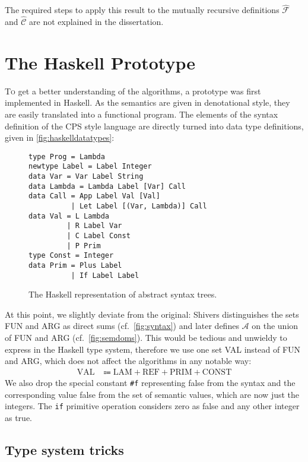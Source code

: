 \documentclass[a4paper,halfparskip,DIV=10,11pt]{scrbook}
\newcommand{\A}{\mathcal A}
\newcommand{\aC}{\widehat{\mathcal C}}
\newcommand{\aF}{\widehat{\mathcal F}}
\begin{document}
The required steps to apply this result to the mutually recursive definitions $\aF$ and $\aC$ are not explained in the dissertation.

\chapter{The Haskell Prototype}
\label{chaphaskell}

\lettrine T{o} get a better understanding of the algorithms, a prototype was first implemented in Haskell. As the semantics are given in denotational style, they are easily translated into a functional program. The elements of the syntax definition of the CPS style language are directly turned into data type definitions, given in \vref{fig:haskelldatatypes}:

\begin{figure}
\begin{framed}
\begin{lstlisting}
type Prog = Lambda
newtype Label = Label Integer
data Var = Var Label String
data Lambda = Lambda Label [Var] Call
data Call = App Label Val [Val]
          | Let Label [(Var, Lambda)] Call
data Val = L Lambda
         | R Label Var
         | C Label Const
         | P Prim
type Const = Integer
data Prim = Plus Label
          | If Label Label 
\end{lstlisting}
\end{framed}
\caption{The Haskell representation of abstract syntax trees.}
\label{fig:haskelldatatypes}
\end{figure}


At this point, we slightly deviate from the original: Shivers distinguishes the sets FUN and ARG as direct sums (cf.\ \vref{fig:syntax}) and later defines $\A$ on the union of FUN and ARG (cf.\ \vref{fig:semdoms}). This would be tedious and unwieldy to express in the Haskell type system, therefore we use one set VAL instead of FUN and ARG, which does not affect the algorithms in any notable way:
\begin{align*}
\text{VAL} &\Coloneqq \text{LAM} + \text{REF} + \text{PRIM} + \text{CONST}
\end{align*}
We also drop the special constant \texttt{\#f} representing false from the syntax and the corresponding value false from the set of semantic values, which are now just the integers. The \texttt{if} primitive operation considers zero as false and any other integer as true.

\section{Type system tricks}
\end{document}
